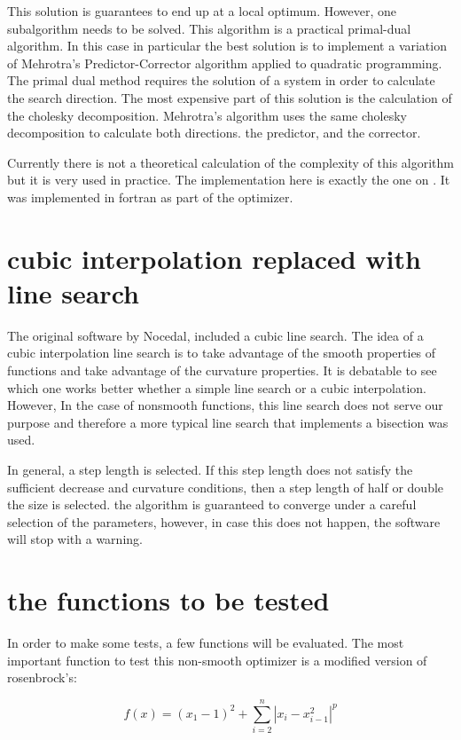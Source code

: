 This solution is guarantees to end up at a local optimum. However, one subalgorithm needs to be solved. This algorithm is a practical primal-dual algorithm. In this case in particular the best solution is to implement a variation of Mehrotra's Predictor-Corrector algorithm applied to quadratic programming. The primal dual method requires the solution of a system in order to calculate the search direction. The most expensive part of this solution is the calculation of the cholesky decomposition. Mehrotra's algorithm uses the same cholesky decomposition to calculate both directions. the predictor, and the corrector.

Currently there is not a theoretical calculation of the complexity of this algorithm but it is very used in practice. The implementation here is exactly the one on \citep{Nocedal}. It was implemented in fortran as part of the optimizer.

\section{cubic interpolation replaced with line search}

The original software by Nocedal\citep{Nocedal}, included a cubic line search. The idea of a cubic interpolation line search is to take advantage of the smooth properties of functions and take advantage of the curvature properties. It is debatable to see which one works better whether a simple line search or a cubic interpolation. However, In the case of nonsmooth functions, this line search does not serve our purpose and therefore a more typical line search that implements a bisection was used.

In general, a step length is selected. If this step length does not satisfy the sufficient decrease and curvature conditions, then a step length of half or double the size is selected. the algorithm is guaranteed to converge under a careful selection of the parameters, however, in case this does not happen, the software will stop with a warning. 

\section{the functions to be tested}

In order to make some tests, a few functions will be evaluated. The most important function to test this non-smooth optimizer is a modified version of rosenbrock's:

\begin{equation}
    f(x) = (x_1 - 1)^2 + \sum_{i = 2}^n |x_i - x_{i - 1}^2|^p
\end{equation}

